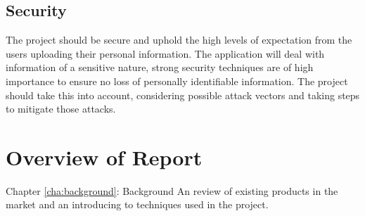 \subsection{Security}
The project should be secure and uphold the high levels of expectation from the users uploading their personal information.
%
The application will deal with information of a sensitive nature, strong security techniques are of high importance to ensure no loss of personally identifiable information. 
% 
The project should take this into account, considering possible attack vectors and taking steps to mitigate those attacks. 

\section{Overview of Report}

Chapter \ref{cha:background}: Background 
An review of existing products in the market and an introducing to techniques used in the project.

